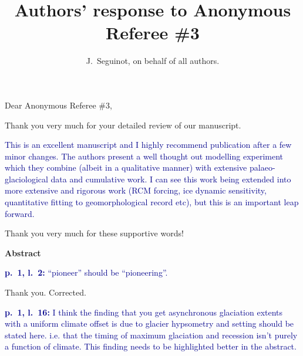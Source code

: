 

\title{Authors' response to Anonymous Referee \#3}
\author{J.~Seguinot, on behalf of all authors.}


\maketitle
\bigskip


\newcommand{\sechead}[1]{\bigskip\noindent\textbf{#1}}
\newcommand{\referee}[1]{\bigskip\noindent\textcolor{darkblue}{#1}}
\newcommand{\msquote}[1]{\begin{quote}\textit{#1}\end{quote}}
\newcommand{\doi}[1]{doi:\allowbreak\href{http://dx.doi.org/#1}{#1}}

Dear Anonymous Referee \#3,

Thank you very much for your detailed review of our manuscript.

    \referee{%
        This is an excellent manuscript and I highly recommend publication
        after a few minor changes. The authors present a well thought out
        modelling experiment which they combine (albeit in a qualitative
        manner) with extensive palaeo-glaciological data and cumulative work. I
        can see this work being extended into more extensive and rigorous work
        (RCM forcing, ice dynamic sensitivity, quantitative fitting to
        geomorphological record etc), but this is an important leap forward.}

    Thank you very much for these supportive words!



\sechead{Abstract}

    \referee{\textbf{p.~1, l.~2:}
        ``pioneer'' should be ``pioneering''.}

    Thank you. Corrected.

    \referee{\textbf{p.~1, l.~16:}
        I think the finding that you get asynchronous glaciation extents with a
        uniform climate offset is due to glacier hypsometry and setting should
        be stated here. i.e.  that the timing of maximum glaciation and
        recession isn't purely a function of climate. This finding needs to be
        highlighted better in the abstract.}

